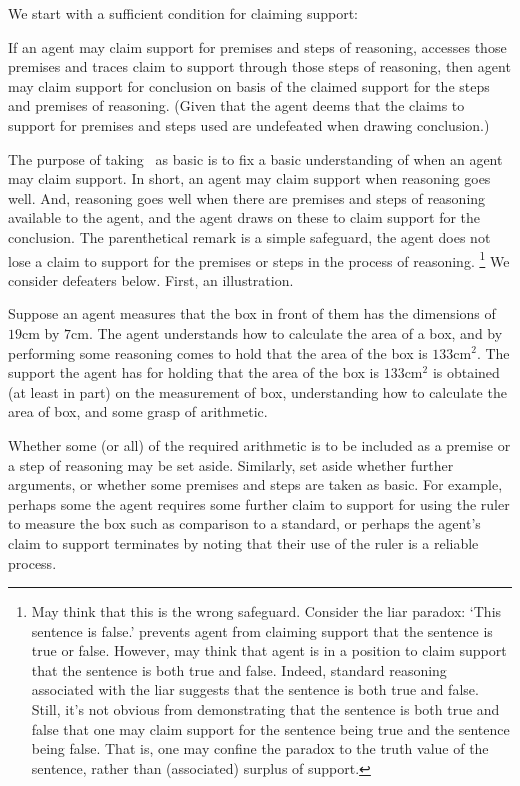 \begin{note}
  We start with a sufficient condition for claiming support:
  \begin{proposition}[\USE{-} --- \USE{}]\label{prem:bP}
    If an agent may claim support for premises and steps of reasoning, accesses those premises and traces claim to support through those steps of reasoning, then agent may claim support for conclusion on basis of the claimed support for the steps and premises of reasoning.
    (Given that the agent deems that the claims to support for premises and steps used are undefeated when drawing conclusion.)
  \end{proposition}

  The purpose of taking~\USE{} as basic is to fix a basic understanding of when an agent may claim support.
  In short, an agent may claim support when reasoning goes well.
  And, reasoning goes well when there are premises and steps of reasoning available to the agent, and the agent draws on these to claim support for the conclusion.
  The parenthetical remark is a simple safeguard, the agent does not lose a claim to support for the premises or steps in the process of reasoning.\nolinebreak
  \footnote{
    May think that this is the wrong safeguard.
    Consider the liar paradox:
    `This sentence is false.'
    \USE{} prevents agent from claiming support that the sentence is true or false.
    However, may think that agent is in a position to claim support that the sentence is both true and false.
    Indeed, standard reasoning associated with the liar suggests that the sentence is both true and false.
    Still, it's not obvious from demonstrating that the sentence is both true and false that one may claim support for the sentence being true and the sentence being false.
    That is, one may confine the paradox to the truth value of the sentence, rather than (associated) surplus of support.
  }
  We consider defeaters below.
  First, an illustration.


  Suppose an agent measures that the box in front of them has the dimensions of \(19\text{cm}\) by \(7\text{cm}\).
  The agent understands how to calculate the area of a box, and by performing some reasoning comes to hold that the area of the box is \(133\text{cm}^{2}\).
  The support the agent has for holding that the area of the box is \(133\text{cm}^{2}\) is obtained (at least in part) on the measurement of box, understanding how to calculate the area of box, and some grasp of arithmetic.

  Whether some (or all) of the required arithmetic is to be included as a premise or a step of reasoning may be set aside.
  Similarly, set aside whether further arguments, or whether some premises and steps are taken as basic.
  For example, perhaps some the agent requires some further claim to support for using the ruler to measure the box such as comparison to a standard, or perhaps the agent's claim to support terminates by noting that their use of the ruler is a reliable process.
\end{note}

